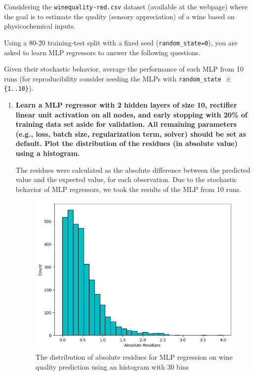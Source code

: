 \documentclass[12pt]{article}
\begin{document}
\noindent Considering the \texttt{winequality-red.csv} dataset (available at the webpage) where the goal is  to estimate the quality (sensory appreciation)
of a wine based on physicochemical inputs.

\vskip 0.2cm

\noindent Using a 80-20 training-test split with a fixed seed (\texttt{random\_state=0}), you are asked to learn MLP
regressors to answer the following questions.

\vskip 0.2cm

\noindent Given their stochastic behavior, average the performance of each MLP from 10 runs (for reproducibility consider seeding the MLPs with
\texttt{random\_state $\in$ \{1..10\}}).

\begin{enumerate}[leftmargin=\labelsep]
  \item \textbf{Learn a MLP regressor with 2 hidden layers of size 10, rectifier linear unit activation
          on all nodes, and early stopping with 20\% of training data set aside for validation. All
          remaining parameters (e.g., loss, batch size, regularization term, solver) should be set as
          default. Plot the distribution of the residues (in absolute value) using a histogram.}\label{ex1}

        \vskip 0.3cm
        

        The residues were calculated as the absolute difference between the predicted value and the expected value, for each observation.
        Due to the stochastic behavior of MLP regressors, we took the results of the MLP from 10 runs.

        \begin{figure}[H]
          \centering
          \includegraphics[width=14cm]{./assets/residues_histogram_ex1_PartII.png}
          \caption{The distribution of absolute residues for MLP regression on wine quality prediction using an histogram with 30 bins}
          \label{fig:PartII-ex1}
        \end{figure}


\end{enumerate}
\end{document}
